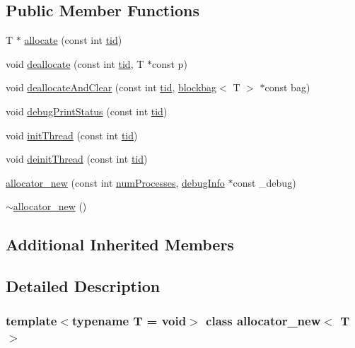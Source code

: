 \subsection*{Public Member Functions}
\begin{DoxyCompactItemize}
\item 
T $\ast$ \hyperlink{classallocator__new_a93705f1c38fc18ec21bdaa37ccfa6ff8}{allocate} (const int \hyperlink{microbench_2main_8cpp_a9ca9869868fe7e7a38a921cc7de4103f}{tid})
\item 
void \hyperlink{classallocator__new_a00547577144cf3d387a064abcdae08ce}{deallocate} (const int \hyperlink{microbench_2main_8cpp_a9ca9869868fe7e7a38a921cc7de4103f}{tid}, T $\ast$const p)
\item 
void \hyperlink{classallocator__new_a37ae8dafab8224d4c09c496ef558156e}{deallocate\+And\+Clear} (const int \hyperlink{microbench_2main_8cpp_a9ca9869868fe7e7a38a921cc7de4103f}{tid}, \hyperlink{classblockbag}{blockbag}$<$ T $>$ $\ast$const bag)
\item 
void \hyperlink{classallocator__new_a6891234824482b3c8b83a1b91521b5e3}{debug\+Print\+Status} (const int \hyperlink{microbench_2main_8cpp_a9ca9869868fe7e7a38a921cc7de4103f}{tid})
\item 
void \hyperlink{classallocator__new_a4b65439e6dc7bbd4da71728599e12895}{init\+Thread} (const int \hyperlink{microbench_2main_8cpp_a9ca9869868fe7e7a38a921cc7de4103f}{tid})
\item 
void \hyperlink{classallocator__new_a913b5e0ed2d2cc75c2e7d03e1a75d47b}{deinit\+Thread} (const int \hyperlink{microbench_2main_8cpp_a9ca9869868fe7e7a38a921cc7de4103f}{tid})
\item 
\hyperlink{classallocator__new_a7256b6a2bf88e0ecd0cc437cd3fb6964}{allocator\+\_\+new} (const int \hyperlink{testing_8cpp_aa085812188e21ede75351d88b9b2c30d}{num\+Processes}, \hyperlink{classdebugInfo}{debug\+Info} $\ast$const \+\_\+debug)
\item 
\hyperlink{classallocator__new_a608b5c8ce78e0d255e9f26ffc9ef00f8}{$\sim$allocator\+\_\+new} ()
\end{DoxyCompactItemize}
\subsection*{Additional Inherited Members}


\subsection{Detailed Description}
\subsubsection*{template$<$typename T = void$>$\newline
class allocator\+\_\+new$<$ T $>$}

